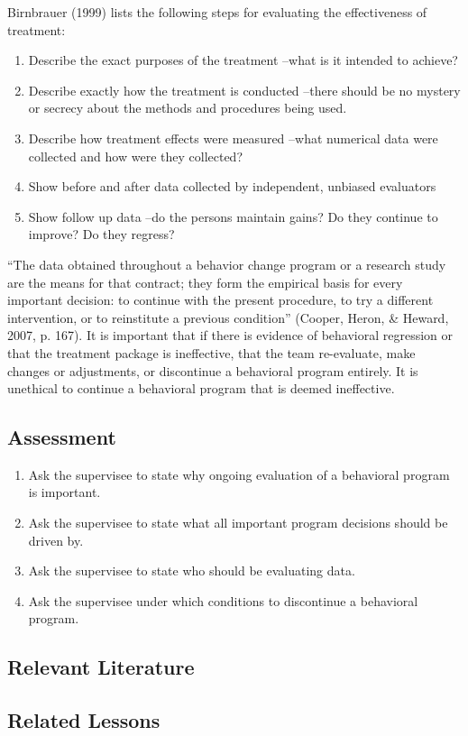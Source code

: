 Birnbrauer (1999) lists the following steps for evaluating the effectiveness of treatment:
\begin{enumerate}
\item Describe the exact purposes of the treatment –what is it intended to achieve? 
\item Describe exactly how the treatment is conducted –there should be no mystery or secrecy about the methods and procedures being used. 
\item Describe how treatment effects were measured –what numerical data were collected and how were they collected? 
\item Show before and after data collected by independent, unbiased evaluators
\item Show follow up data –do the persons maintain gains? Do they continue to improve? Do they regress? 
\end{enumerate}

``The data obtained throughout a behavior change program or a research study are the means for that contract; they form the empirical basis for every important decision: to continue with the present procedure, to try a different intervention, or to reinstitute a previous condition'' (Cooper, Heron, \& Heward, 2007, p. 167).  It is important that if there is evidence of behavioral regression or that the treatment package is ineffective, that the team re-evaluate, make changes or adjustments, or discontinue a behavioral program entirely.  It is unethical to continue a behavioral program that is deemed ineffective. 
%
\subsection{Assessment}
\begin{enumerate}
\item Ask the supervisee to state why ongoing evaluation of a behavioral program is important.
\item Ask the supervisee to state what all important program decisions should be driven by.
\item Ask the supervisee to state who should be evaluating data.
\item Ask the supervisee under which conditions to discontinue a behavioral program.
%
\end{enumerate}
%
\subsection{Relevant Literature}
\begin{refsection}
\nocite{bailey2013ethics,
        birnbrauer1999how,
        cooper2007applied}
\printbibliography[heading=none]
\end{refsection}
%
\subsection{Related Lessons}
\fourbOne{}\\
\fourFKFourtySeven{}\\
\fourgOne{}\\
\fourhOne{}\\
\fouriOne{}\\
\fouriFive{}\\
\fouriSix{}\\
\fourjOne{}\\
\fourkSeven{}\\
